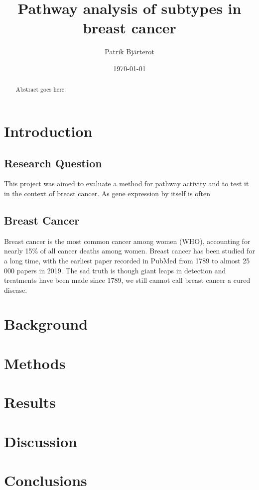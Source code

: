 \documentclass{kththesis}
\title{Pathway analysis of subtypes in breast cancer}
\author{Patrik Bjärterot}
\date{\today}
\begin{document}
\frontmatter

\titlepage

\begin{abstract}
  Abstract goes here.

\end{abstract}

\tableofcontents


\mainmatter


\chapter{Introduction}

    \section{Research Question}
    This project was aimed to evaluate a method for pathway activity and to test it in the context of breast cancer. As gene expression by itself is often



    \section{Breast Cancer}
    Breast cancer is the most common cancer among women (WHO), accounting for nearly 15\% of all cancer deaths among women.
    Breast cancer has been studied for a long time, with the earliest paper recorded in PubMed from 1789 to almost 25 000 papers in 2019. The sad truth is though giant leaps in detection and treatments have been made since 1789, we still cannot call breast cancer a cured disease. 



\chapter{Background}


\chapter{Methods}


\chapter{Results}


\chapter{Discussion}


\chapter{Conclusions}
\blindtext

\printbibliography[heading=bibintoc]

\appendix


\tailmatter
\end{document}

